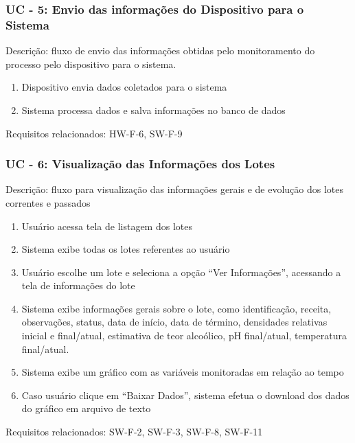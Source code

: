 \subsubsection*{UC - 5: Envio das informações do Dispositivo para o Sistema}
Descrição: fluxo de envio das informações obtidas pelo monitoramento do processo pelo dispositivo para o sistema.
\begin{enumerate}
    \item Dispositivo envia dados coletados para o sistema
    \item Sistema processa dados e salva informações no banco de dados
\end{enumerate}    
Requisitos relacionados: HW-F-6, SW-F-9

\subsubsection*{UC - 6: Visualização das Informações dos Lotes}
Descrição: fluxo para visualização das informações gerais e de evolução dos lotes correntes e passados
\begin{enumerate}
    \item Usuário acessa tela de listagem dos lotes
    \item Sistema exibe todas os lotes referentes ao usuário
    \item Usuário escolhe um lote e seleciona a opção “Ver Informações”, acessando a tela de informações do lote
    \item Sistema exibe informações gerais sobre o lote, como identificação, receita, observações, status, data de início, data de término, densidades relativas inicial e final/atual, estimativa de teor alcoólico, pH final/atual, temperatura final/atual.
    \item Sistema exibe um gráfico com as variáveis monitoradas em relação ao tempo
    \item Caso usuário clique em “Baixar Dados”, sistema efetua o download dos dados do gráfico em arquivo de texto
\end{enumerate}    
Requisitos relacionados: SW-F-2, SW-F-3, SW-F-8, SW-F-11

